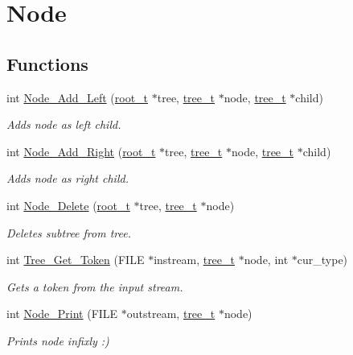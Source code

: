 \hypertarget{group__node}{\section{Node}
\label{group__node}
}
\subsection*{Functions}
\begin{DoxyCompactItemize}
\item 
int \hyperlink{group__node_ga728fb32544bba7f36fcd5b387f83c56c}{Node\-\_\-\-Add\-\_\-\-Left} (\hyperlink{structroot__t}{root\-\_\-t} $\ast$tree, \hyperlink{structtree__t}{tree\-\_\-t} $\ast$node, \hyperlink{structtree__t}{tree\-\_\-t} $\ast$child)
\begin{DoxyCompactList}\small\item\em Adds node as left child. \end{DoxyCompactList}\item 
int \hyperlink{group__node_ga6c8866b52402756aa833e64408ee261e}{Node\-\_\-\-Add\-\_\-\-Right} (\hyperlink{structroot__t}{root\-\_\-t} $\ast$tree, \hyperlink{structtree__t}{tree\-\_\-t} $\ast$node, \hyperlink{structtree__t}{tree\-\_\-t} $\ast$child)
\begin{DoxyCompactList}\small\item\em Adds node as right child. \end{DoxyCompactList}\item 
int \hyperlink{group__node_gada42bad6242102ade526ba049ac625d4}{Node\-\_\-\-Delete} (\hyperlink{structroot__t}{root\-\_\-t} $\ast$tree, \hyperlink{structtree__t}{tree\-\_\-t} $\ast$node)
\begin{DoxyCompactList}\small\item\em Deletes subtree from tree. \end{DoxyCompactList}\item 
int \hyperlink{group__node_ga0f399b6c1710ff8e7be6d7b2504ce5df}{Tree\-\_\-\-Get\-\_\-\-Token} (F\-I\-L\-E $\ast$instream, \hyperlink{structtree__t}{tree\-\_\-t} $\ast$node, int $\ast$cur\-\_\-type)
\begin{DoxyCompactList}\small\item\em Gets a token from the input stream. \end{DoxyCompactList}\item 
int \hyperlink{group__node_gaa9cf48f86d21d57356c9234fd7be63f7}{Node\-\_\-\-Print} (F\-I\-L\-E $\ast$outstream, \hyperlink{structtree__t}{tree\-\_\-t} $\ast$node)
\begin{DoxyCompactList}\small\item\em Prints node infixly \-:) \end{DoxyCompactList}\item 

\end{DoxyCompactItemize}
